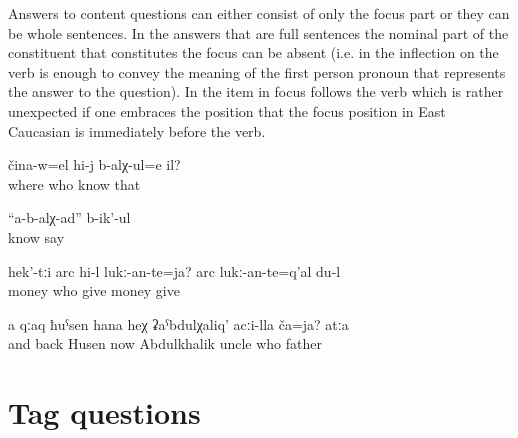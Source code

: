 Answers to content questions can either consist of only the focus part  or they can be whole sentences. In the answers that are full sentences the nominal part of the constituent that constitutes the focus can be absent (i.e. in  the inflection on the verb is enough to convey the meaning of the first person pronoun that represents the answer to the question). In  the item in focus follows the verb which is rather unexpected if one embraces the position that the focus position in East Caucasian is immediately before the verb.
%
\begin{exe}
	\ex	\label{ex:‎‎‎Who knows where he is}
	\gll	čina-w=el	hi-j	b-alχ-ul=e	il?\\
		where	who	know	that\\
	\glt	{}

	\ex	\label{ex:‎‎We do not know, they say}
	\gll	``a-b-alχ-ad''	b-ik'-ul\\
		know	say\\
	\glt	{}

	\ex	\label{ex:‎‎‎Who should give this money (back)? ‎‎I have to give the money back}
	\gll	hek'-tːi	arc	hi-l	lukː-an-te=ja?		arc	lukː-an-te=q'al	du-l\\
			money	who	give	money	give	\\
	\glt	{}

	\ex	\label{ex:‎And Kak Husen, who is he with respect to uncle Abdukhalik? The Father}
	\gll	a	qːaq	ħuˁsen	hana	heχ	ʡaˁbdulχaliq'	acːi-lla	ča=ja? 		atːa\\
		and	back	Husen	now		Abdulkhalik	uncle	who	 father\\
	\glt	{}
\end{exe}



\section{Tag questions}
\label{sec:Tag questions}

